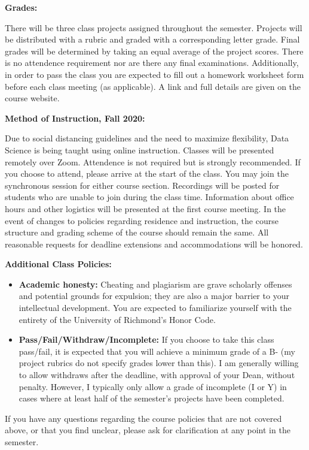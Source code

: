 \documentclass[12pt, a4paper]{article}
\begin{document}
\textbf{Grades:} \vspace{6pt}

There will be three class projects assigned throughout the semester. Projects will be
distributed with a rubric and graded with a corresponding letter grade. Final grades will
be determined by taking an equal average of the project scores. There is no attendence
requirement nor are there any final examinations. Additionally, in order to pass the class
you are expected to fill out a homework worksheet form before each class meeting
(as applicable). A link and full details are given on the course website.

\bigskip

\textbf{Method of Instruction, Fall 2020:} \vspace{6pt}

Due to social distancing guidelines and the need to maximize
flexibility, Data Science is being taught using online instruction. Classes will be
presented remotely over Zoom. Attendence is not required but is strongly
recommended. If you choose to attend, please arrive at the start of the class. You may
join the synchronous session for either course section. Recordings will be posted for
students who are unable to join during the class time. Information about office hours
and other logistics will be presented at the first course meeting. In the event of changes
to policies regarding residence and instruction, the course structure
and grading scheme of the course should remain the same. All reasonable requests for
deadline extensions and accommodations will be honored.

\bigskip

\textbf{Additional Class Policies:} \vspace{6pt}

\begin{itemize}\setlength\itemsep{0em}
\item \textbf{Academic honesty:}
Cheating and plagiarism are grave scholarly offenses and potential grounds
for expulsion; they are also a major barrier to your intellectual development.
You are expected to familiarize yourself with the entirety of the
University of Richmond’s Honor Code.
\item \textbf{Pass/Fail/Withdraw/Incomplete:} If you choose to take this
class pass/fail, it is expected that you will achieve a minimum grade of a B- (my project
rubrics do not specify grades lower than this). I am generally willing to allow withdraws
after the deadline, with approval of your Dean, without penalty. However, I typically only
allow a grade of incomplete (I or Y) in cases where at least half of the semester's projects
have been completed.
\end{itemize}

If you have any questions regarding the course policies that are not covered above, or
that you find unclear, please ask for clarification at any point in the semester.
\end{document}
